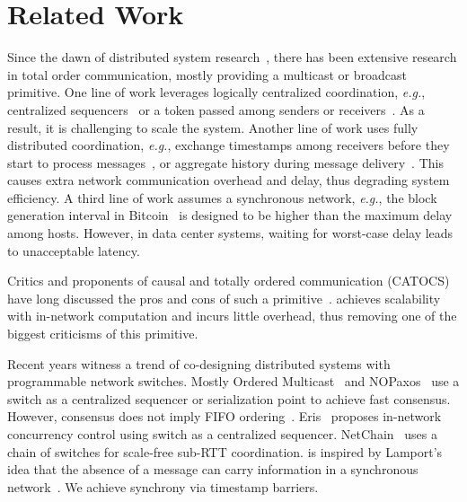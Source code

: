 \section{Related Work}
\label{sec:related}

Since the dawn of distributed system research~\cite{lamport1978time}, there has been extensive research in total order communication, mostly providing a multicast or broadcast primitive.
One line of work leverages logically centralized coordination, \textit{e.g.}, centralized sequencers~\cite{eris} or a token passed among senders or receivers~\cite{rajagopalan1989token,kim1997total,ekwall2004token}.
As a result, it is challenging to scale the system.
Another line of work uses fully distributed coordination, \textit{e.g.}, exchange timestamps among receivers before they start to process messages~\cite{lamport1978time}, or aggregate history during message delivery~\cite{chandra1996unreliable}.
This causes extra network communication overhead and delay, thus degrading system efficiency.
A third line of work assumes a synchronous network, \textit{e.g.}, the block generation interval in Bitcoin~\cite{nakamoto2008bitcoin} is designed to be higher than the maximum delay among hosts.
However, in data center systems, waiting for worst-case delay leads to unacceptable latency.

Critics and proponents of causal and totally ordered communication (CATOCS) have long discussed the pros and cons of such a primitive~\cite{cheriton1994understanding,birman1994response,van1994bother}. 
\sys achieves scalability with in-network computation and incurs little overhead, thus removing one of the biggest criticisms of this primitive.

Recent years witness a trend of co-designing distributed systems with programmable network switches.
Mostly Ordered Multicast~\cite{ports2015designing} and NOPaxos~\cite{li2016just} use a switch as a centralized sequencer or serialization point to achieve fast consensus.
However, consensus does not imply FIFO ordering~\cite{junqueira2011zab}.
Eris~\cite{eris} proposes in-network concurrency control using switch as a centralized sequencer.
NetChain~\cite{jin2018netchain} uses a chain of switches for scale-free sub-RTT coordination.
\sys{} is inspired by Lamport's idea that the absence of a message can carry information in a synchronous network~\cite{lamport1984using}. We achieve synchrony via timestamp barriers.


